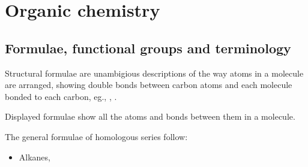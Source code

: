 \section{Organic chemistry}
\subsection{Formulae, functional groups and terminology}
Structural formulae are unambigious descriptions of the way atoms in a molecule are arranged,
showing double bonds between carbon atoms and each molecule bonded to each carbon, eg., 
, .

Displayed formulae show all the atoms and bonds between them in a molecule. 

The general formulae of homologous series follow:
\begin{itemize}
	\item Alkanes, 
\end{itemize}


